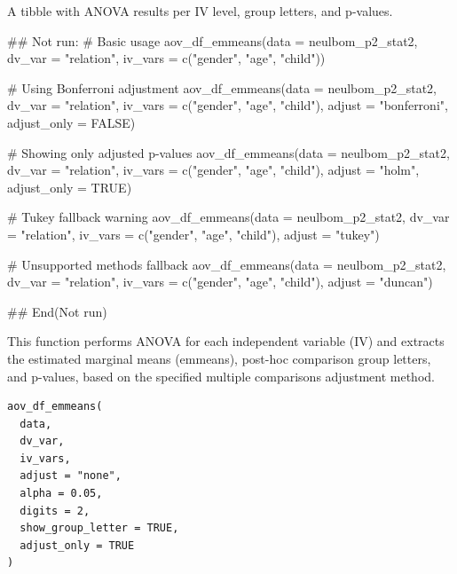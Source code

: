 \documentclass[a4paper]{book}
\begin{document}
%
\begin{Value}
A tibble with ANOVA results per IV level, group letters, and p-values.
\end{Value}
%
\begin{Examples}
\begin{ExampleCode}
\#\# Not run: 
# Basic usage
aov_df_emmeans(data = neulbom_p2_stat2,
               dv_var = "relation",
               iv_vars = c("gender", "age", "child"))

# Using Bonferroni adjustment
aov_df_emmeans(data = neulbom_p2_stat2,
               dv_var = "relation",
               iv_vars = c("gender", "age", "child"),
               adjust = "bonferroni", adjust_only = FALSE)

# Showing only adjusted p-values
aov_df_emmeans(data = neulbom_p2_stat2,
               dv_var = "relation",
               iv_vars = c("gender", "age", "child"),
               adjust = "holm", adjust_only = TRUE)

# Tukey fallback warning
aov_df_emmeans(data = neulbom_p2_stat2,
               dv_var = "relation",
               iv_vars = c("gender", "age", "child"),
               adjust = "tukey")

# Unsupported methods fallback
aov_df_emmeans(data = neulbom_p2_stat2,
               dv_var = "relation",
               iv_vars = c("gender", "age", "child"),
               adjust = "duncan")

## End(Not run)
\end{ExampleCode}
\end{Examples}
%
\begin{Description}
This function performs ANOVA for each independent variable (IV) and extracts
the estimated marginal means (emmeans), post-hoc comparison group letters, and
p-values, based on the specified multiple comparisons adjustment method.
\end{Description}
%
\begin{Usage}
\begin{verbatim}
aov_df_emmeans(
  data,
  dv_var,
  iv_vars,
  adjust = "none",
  alpha = 0.05,
  digits = 2,
  show_group_letter = TRUE,
  adjust_only = TRUE
)
\end{verbatim}
\end{Usage}
%
\end{document}
